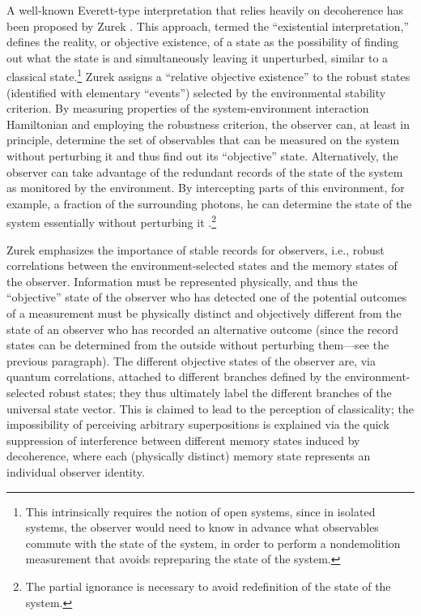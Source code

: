 \documentclass[rmp,aps,amsmath,amsfonts,noshowkeys,noshowpacs,12pt]{revtex4}
\newcommand{\cf}{cf.\ }
\begin{document}
A well-known Everett-type interpretation that relies heavily on
decoherence has been proposed by Zurek
\citetext{\citeyear{Zurek:1993:pu}, \citeyear{Zurek:1998:re}; see also
  the recent reevaluation in \citealp{Zurek:2004:yb}}.  This approach,
termed the ``existential interpretation,'' defines the reality, or
objective existence, of a state as the possibility of finding out what
the state is and simultaneously leaving it unperturbed, similar to a
classical state.\footnote{This intrinsically requires the notion of
  open systems, since in isolated systems, the observer would need to
  know in advance what observables commute with the state of the
  system, in order to perform a nondemolition measurement that avoids
  repreparing the state of the system.} Zurek assigns a ``relative
objective existence'' to the robust states (identified with elementary
``events'') selected by the environmental stability criterion. By
measuring properties of the system-environment interaction
Hamiltonian and employing the robustness criterion, the observer can,
at least in principle, determine the set of observables that can be
measured on the system without perturbing it and thus find out its
``objective'' state.  Alternatively, the observer can take advantage
of the redundant records of the state of the system as monitored by
the environment. By intercepting parts of this environment, for
example, a fraction of the surrounding photons, he can determine the
state of the system essentially without perturbing it \citep[\cf also
the related recent ideas of ``quantum Darwinism'' and the role of the
environment as a ``witness,''
see][]{Zurek:2000:tr,Zurek:2002:ii,Zurek:2003:pl,Ollivier:2003:za}.\footnote{The
  partial ignorance is necessary to avoid  redefinition of the
  state of the system.}

Zurek emphasizes the importance of stable records for observers, i.e.,
robust correlations between the environment-selected states and the
memory states of the observer. Information must be represented
physically, and thus the ``objective'' state of the observer who has
detected one of the potential outcomes of a measurement must be
physically distinct and objectively different from the state of an
observer who has recorded an alternative outcome (since the record
states can be determined from the outside without perturbing
them---see the previous paragraph). The different objective states
of the observer are, via quantum correlations, attached to different
branches defined by the environment-selected robust states; they thus
ultimately label the different branches of the universal state
vector. This is claimed to lead to the perception of classicality; the
impossibility of perceiving arbitrary superpositions is explained via
the quick suppression of interference between different memory states
induced by decoherence, where each (physically distinct) memory state
represents an individual observer identity.
\end{document}
